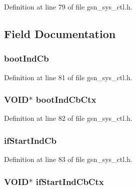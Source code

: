 Definition at line 79 of file gsn\_\-sys\_\-ctl.h.



\subsection{Field Documentation}
\hypertarget{a00253_a81177006545c34a1f1b26662b314e24b}{
\subsubsection[{bootIndCb}]{ {\bf bootIndCb}}}
\label{a00253_a81177006545c34a1f1b26662b314e24b}


Definition at line 81 of file gsn\_\-sys\_\-ctl.h.

\hypertarget{a00253_a9a462991fb1432d5d746840a1c0c6da5}{
\subsubsection[{bootIndCbCtx}]{\setlength{\rightskip}{0pt plus 5cm}VOID$\ast$ {\bf bootIndCbCtx}}}
\label{a00253_a9a462991fb1432d5d746840a1c0c6da5}


Definition at line 82 of file gsn\_\-sys\_\-ctl.h.

\hypertarget{a00253_a992a1d58820600ab4aa8881f357397c2}{
\subsubsection[{ifStartIndCb}]{ {\bf ifStartIndCb}}}
\label{a00253_a992a1d58820600ab4aa8881f357397c2}


Definition at line 83 of file gsn\_\-sys\_\-ctl.h.

\hypertarget{a00253_ac77f45adf4c13d98b4ed72cff10f25fc}{
\subsubsection[{ifStartIndCbCtx}]{\setlength{\rightskip}{0pt plus 5cm}VOID$\ast$ {\bf ifStartIndCbCtx}}}
\label{a00253_ac77f45adf4c13d98b4ed72cff10f25fc}


